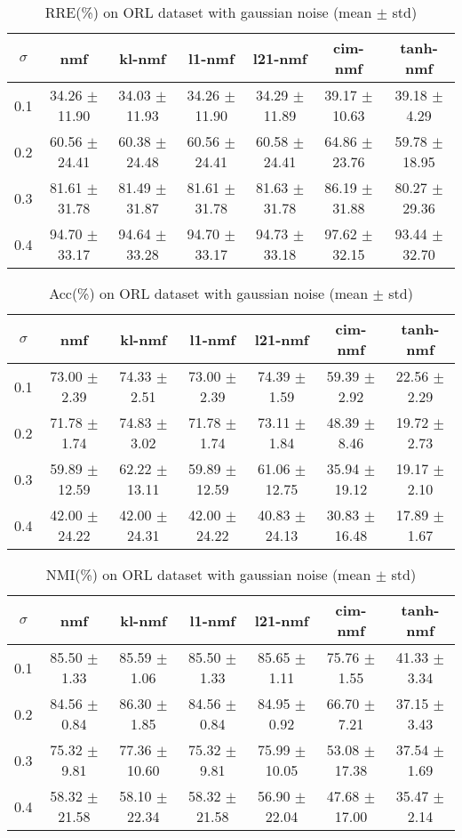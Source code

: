 \documentclass{article} %
\begin{document}
\begin{table}
\begin{tabular}{c|cccccc}$\sigma$ & nmf & kl-nmf & l1-nmf & l21-nmf & cim-nmf & tanh-nmf \\\hline
0.1 & 34.26 $\pm$ 11.90 & 34.03 $\pm$ 11.93 & 34.26 $\pm$ 11.90 & 34.29 $\pm$ 11.89 & 39.17 $\pm$ 10.63 & 39.18 $\pm$ 4.29 \\
0.2 & 60.56 $\pm$ 24.41 & 60.38 $\pm$ 24.48 & 60.56 $\pm$ 24.41 & 60.58 $\pm$ 24.41 & 64.86 $\pm$ 23.76 & 59.78 $\pm$ 18.95 \\
0.3 & 81.61 $\pm$ 31.78 & 81.49 $\pm$ 31.87 & 81.61 $\pm$ 31.78 & 81.63 $\pm$ 31.78 & 86.19 $\pm$ 31.88 & 80.27 $\pm$ 29.36 \\
0.4 & 94.70 $\pm$ 33.17 & 94.64 $\pm$ 33.28 & 94.70 $\pm$ 33.17 & 94.73 $\pm$ 33.18 & 97.62 $\pm$ 32.15 & 93.44 $\pm$ 32.70 \\
\end{tabular}\caption{
  RRE(\%) on ORL dataset with gaussian noise (mean $\pm$ std)
  \label{tab:RRE-ORL-gaussian}
}\end{table}
\begin{table}
\begin{tabular}{c|cccccc}$\sigma$ & nmf & kl-nmf & l1-nmf & l21-nmf & cim-nmf & tanh-nmf \\\hline
0.1 & 73.00 $\pm$ 2.39 & 74.33 $\pm$ 2.51 & 73.00 $\pm$ 2.39 & 74.39 $\pm$ 1.59 & 59.39 $\pm$ 2.92 & 22.56 $\pm$ 2.29 \\
0.2 & 71.78 $\pm$ 1.74 & 74.83 $\pm$ 3.02 & 71.78 $\pm$ 1.74 & 73.11 $\pm$ 1.84 & 48.39 $\pm$ 8.46 & 19.72 $\pm$ 2.73 \\
0.3 & 59.89 $\pm$ 12.59 & 62.22 $\pm$ 13.11 & 59.89 $\pm$ 12.59 & 61.06 $\pm$ 12.75 & 35.94 $\pm$ 19.12 & 19.17 $\pm$ 2.10 \\
0.4 & 42.00 $\pm$ 24.22 & 42.00 $\pm$ 24.31 & 42.00 $\pm$ 24.22 & 40.83 $\pm$ 24.13 & 30.83 $\pm$ 16.48 & 17.89 $\pm$ 1.67 \\
\end{tabular}\caption{
  Acc(\%) on ORL dataset with gaussian noise (mean $\pm$ std)
  \label{tab:Acc-ORL-gaussian}
}\end{table}
\begin{table}
\begin{tabular}{c|cccccc}$\sigma$ & nmf & kl-nmf & l1-nmf & l21-nmf & cim-nmf & tanh-nmf \\\hline
0.1 & 85.50 $\pm$ 1.33 & 85.59 $\pm$ 1.06 & 85.50 $\pm$ 1.33 & 85.65 $\pm$ 1.11 & 75.76 $\pm$ 1.55 & 41.33 $\pm$ 3.34 \\
0.2 & 84.56 $\pm$ 0.84 & 86.30 $\pm$ 1.85 & 84.56 $\pm$ 0.84 & 84.95 $\pm$ 0.92 & 66.70 $\pm$ 7.21 & 37.15 $\pm$ 3.43 \\
0.3 & 75.32 $\pm$ 9.81 & 77.36 $\pm$ 10.60 & 75.32 $\pm$ 9.81 & 75.99 $\pm$ 10.05 & 53.08 $\pm$ 17.38 & 37.54 $\pm$ 1.69 \\
0.4 & 58.32 $\pm$ 21.58 & 58.10 $\pm$ 22.34 & 58.32 $\pm$ 21.58 & 56.90 $\pm$ 22.04 & 47.68 $\pm$ 17.00 & 35.47 $\pm$ 2.14 \\
\end{tabular}\caption{
  NMI(\%) on ORL dataset with gaussian noise (mean $\pm$ std)
  \label{tab:NMI-ORL-gaussian}
}\end{table}
\end{document}
